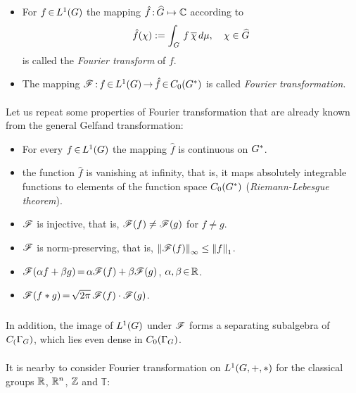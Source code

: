 \documentclass[11pt,twoside]{article}
\begin{document}
\begin{itemize}[leftmargin=12pt]
\item[1.]
For $f {\,\in\,} L^1(G)$
the mapping $\hat{f} {\,:\,} \widehat{G} \mapsto {\mathbb{C}}$ according to
\[
\hat{f}(\chi) := \int_{G} \, f \, \overline{\chi} \, d\mu,
\quad
\chi \in \widehat{G}
\]
is called the \textit{Fourier transform} of $f$.

\item[2.]
The mapping
$\mathscr{F} {\,:\,} f {\,\in\,} L^1(G) {\,\to\,} \hat{f} {\,\in\,} C_0(G^*)$
is called \textit{Fourier transformation}.
\end{itemize}

\paragraph{} %
Let us repeat some properties of Fourier transformation
that are already known from the general Gelfand transformation:

\begin{itemize}[leftmargin=12pt]
\item[1.]
For every $f {\,\in\,} L^1(G)$ the mapping $\hat{f}$ is continuous on $G^*$.

\item[2.]
the function $\hat{f}$ is vanishing at infinity,
that is,
it maps absolutely integrable functions
to elements of the function space $C_0(G^*)$
(\textit{Riemann-Lebesgue theorem}).

\item[3.]
$\mathscr{F}$ is injective,
that is,
$\mathscr{F}(f) \neq \mathscr{F}(g)$ for $f \neq g$.

\item[4.]
$\mathscr{F}$ is norm-preserving,
that is,
$\left\lVert \mathscr{F}(f) \right\rVert_{\infty} \leq \left\lVert f \right\rVert_1$.

\item[5.]
$\mathscr{F}(\alpha f + \beta g) {\,=\,} \alpha \mathscr{F}(f) + \beta \mathscr{F}(g)$,
    $\alpha,\beta {\,\in\,} {\mathbb{R}}$.

\item[6.]
$\mathscr{F}(f \ast g) {\,=\,} \sqrt{2\pi} \, \mathscr{F}(f) \cdot \mathscr{F}(g)$.
\end{itemize}

\subparagraph{}
In addition,
the image of $L^1(G)$ under $\mathscr{F}$ forms a separating subalgebra
of $C_(\Gamma_{G})$,
which lies even dense in $C_0(\Gamma_{G})$. 

\paragraph{} %
It is nearby to consider Fourier transformation
on $L^1(G,+,\ast)$ for the classical groups
${\mathbb{R}}$, ${\mathbb{R}}^n$, ${\mathbb{Z}}$ and $\mathbb{T}$:
\end{document}
